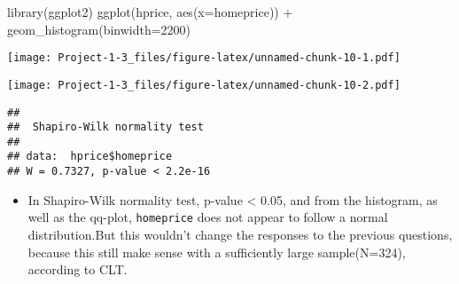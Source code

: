 \documentclass[
  12pt,
]{article}
\newenvironment{Shaded}{\begin{snugshade}}{\end{snugshade}}
\newcommand{\AttributeTok}[1]{\textcolor[rgb]{0.77,0.63,0.00}{#1}}
\newcommand{\DecValTok}[1]{\textcolor[rgb]{0.00,0.00,0.81}{#1}}
\newcommand{\FunctionTok}[1]{\textcolor[rgb]{0.00,0.00,0.00}{#1}}
\newcommand{\NormalTok}[1]{#1}
\newcommand{\SpecialCharTok}[1]{\textcolor[rgb]{0.00,0.00,0.00}{#1}}
\newcommand{\StringTok}[1]{\textcolor[rgb]{0.31,0.60,0.02}{#1}}
\providecommand{\tightlist}{%
  \setlength{\itemsep}{0pt}\setlength{\parskip}{0pt}}
\begin{document}
\begin{Shaded}
\begin{Highlighting}[]
\FunctionTok{library}\NormalTok{(ggplot2)}
\FunctionTok{ggplot}\NormalTok{(hprice, }\FunctionTok{aes}\NormalTok{(}\AttributeTok{x=}\NormalTok{homeprice)) }\SpecialCharTok{+} \FunctionTok{geom\_histogram}\NormalTok{(}\AttributeTok{binwidth=}\DecValTok{2200}\NormalTok{)}
\end{Highlighting}
\end{Shaded}

\texttt{[image: Project-1-3\_files/figure-latex/unnamed-chunk-10-1.pdf]}

\begin{Shaded}
\end{Shaded}

\texttt{[image: Project-1-3\_files/figure-latex/unnamed-chunk-10-2.pdf]}

\begin{Shaded}
\end{Shaded}

\begin{verbatim}
## 
##  Shapiro-Wilk normality test
## 
## data:  hprice$homeprice
## W = 0.7327, p-value < 2.2e-16
\end{verbatim}

\begin{itemize}
\tightlist
\item
  In Shapiro-Wilk normality test, p-value \textless{} 0.05, and from the
  histogram, as well as the qq-plot, \texttt{homeprice} does not appear
  to follow a normal distribution.But this wouldn't change the responses
  to the previous questions, because this still make sense with a
  sufficiently large sample(N=324), according to CLT.\\
\end{itemize}
\end{document}
